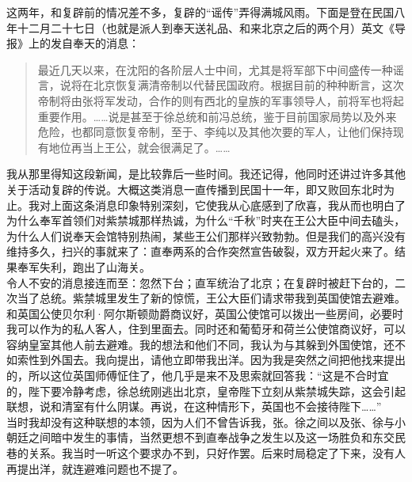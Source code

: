 这两年，和复辟前的情况差不多，复辟的“谣传”弄得满城风雨。下面是登在民国八年十二月二十七日（也就是派人到奉天送礼品、和来北京之后的两个月）英文《导报》上的发自奉天的消息：\\

\begin{quote}
	最近几天以来，在沈阳的各阶层人士中间，尤其是将军部下中间盛传一种谣言，说将在北京恢复满清帝制以代替民国政府。根据目前的种种断言，这次帝制将由张将军发动，合作的则有西北的皇族的军事领导人，前将军也将起重要作用。……说是甚至于徐总统和前冯总统，鉴于目前国家局势以及外来危险，也都同意恢复帝制，至于、李纯以及其他次要的军人，让他们保持现有地位再当上王公，就会很满足了。……\\
\end{quote}

我从那里得知这段新闻，是比较靠后一些时间。我还记得，他同时还讲过许多其他关于活动复辟的传说。大概这类消息一直传播到民国十一年，即又败回东北时为止。我对上面这条消息印象特别深刻，它使我从心底感到了欣喜，我从而也明白了为什么奉军首领们对紫禁城那样热诚，为什么“千秋”时夹在王公大臣中间去磕头，为什么人们说奉天会馆特别热闹，某些王公们那样兴致勃勃。但是我们的高兴没有维持多久，扫兴的事就来了：直奉两系的合作突然宣告破裂，双方开起火来了。结果奉军失利，跑出了山海关。\\

令人不安的消息接连而至：忽然下台；直军统治了北京；在复辟时被赶下台的，二次当了总统。紫禁城里发生了新的惊慌，王公大臣们请求带我到英国使馆去避难。和英国公使贝尔利·阿尔斯顿勋爵商议好，英国公使馆可以拨出一些房间，必要时我可以作为的私人客人，住到里面去。同时还和葡萄牙和荷兰公使馆商议好，可以容纳皇室其他人前去避难。我的想法和他们不同，我认为与其躲到外国使馆，还不如索性到外国去。我向提出，请他立即带我出洋。因为我是突然之间把他找来提出的，所以这位英国师傅怔住了，他几乎是来不及思索就回答我：“这是不合时宜的，陛下要冷静考虑，徐总统刚逃出北京，皇帝陛下立刻从紫禁城失踪，这会引起联想，说和清室有什么阴谋。再说，在这种情形下，英国也不会接待陛下……”\\

当时我却没有这种联想的本领，因为人们不曾告诉我，张。徐之间以及张、徐与小朝廷之间暗中发生的事情，当然更想不到直奉战争之发生以及这一场胜负和东交民巷的关系。我当时一听这个要求办不到，只好作罢。后来时局稳定了下来，没有人再提出洋，就连避难问题也不提了。\\

